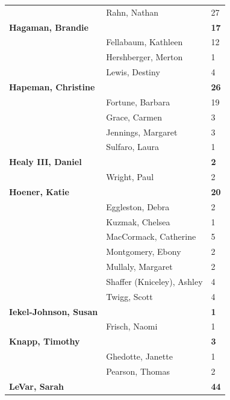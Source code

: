 \documentclass{article}\usepackage[]{graphicx}\usepackage[]{color}
\begin{document}
{\begin{longtable} { >{\raggedright}p{}|p{}p{}}
   \rowcolor[gray]{0.90} & Rahn, Nathan & 27 \\ 
  \textbf{Hagaman, Brandie} &  & \hspace{2cm}\textbf{17} \\ 
   & Fellabaum, Kathleen & 12 \\ 
   & Hershberger, Merton & 1 \\ 
   \rowcolor[gray]{0.90} & Lewis, Destiny & 4 \\ 
   \rowcolor[gray]{0.90}\textbf{Hapeman, Christine} &  & \hspace{2cm}\textbf{26} \\ 
   \rowcolor[gray]{0.90} & Fortune, Barbara & 19 \\ 
   & Grace, Carmen & 3 \\ 
   & Jennings, Margaret & 3 \\ 
   & Sulfaro, Laura & 1 \\ 
   \rowcolor[gray]{0.90}\textbf{Healy III, Daniel} &  & \hspace{2cm}\textbf{2} \\ 
   \rowcolor[gray]{0.90} & Wright, Paul & 2 \\ 
   \rowcolor[gray]{0.90}\textbf{Hoener, Katie} &  & \hspace{2cm}\textbf{20} \\ 
   & Eggleston, Debra & 2 \\ 
   & Kuzmak, Chelsea & 1 \\ 
   & MacCormack, Catherine & 5 \\ 
   \rowcolor[gray]{0.90} & Montgomery, Ebony & 2 \\ 
   \rowcolor[gray]{0.90} & Mullaly, Margaret & 2 \\ 
   \rowcolor[gray]{0.90} & Shaffer (Kniceley), Ashley & 4 \\ 
   & Twigg, Scott & 4 \\ 
  \textbf{Iekel-Johnson, Susan} &  & \hspace{2cm}\textbf{1} \\ 
   & Frisch, Naomi & 1 \\ 
   \rowcolor[gray]{0.90}\textbf{Knapp, Timothy} &  & \hspace{2cm}\textbf{3} \\ 
   \rowcolor[gray]{0.90} & Ghedotte, Janette & 1 \\ 
   \rowcolor[gray]{0.90} & Pearson, Thomas & 2 \\ 
  \textbf{LeVar, Sarah} &  & \hspace{2cm}\textbf{44} \\ 

\end{longtable}}
\end{document}
